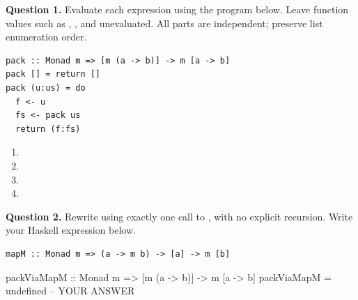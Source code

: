 


\mockrules
\textbf{Question 1.} Evaluate each expression using the program below. Leave
function values such as , , and  unevaluated.
All parts are independent; preserve list enumeration order.
\par\noindent\begin{minipage}{\linewidth}
\begin{lstlisting}
pack :: Monad m => [m (a -> b)] -> m [a -> b]
pack [] = return []
pack (u:us) = do
  f <- u
  fs <- pack us
  return (f:fs)
\end{lstlisting}
\end{minipage}\par
\begin{enumerate}[label=(\alph*)]
\item {}
\answer{[Result.]}
\item {}
\answer{[Result.]}
\item {}
\answer{[Result.]}
\item {}
\end{enumerate}
\textbf{Question 2.} Rewrite  using exactly one call to ,
with no explicit recursion. Write your Haskell expression below.
\par\noindent\begin{minipage}{\linewidth}
\begin{lstlisting}
mapM :: Monad m => (a -> m b) -> [a] -> m [b]
\end{lstlisting}
\end{minipage}\par
\par\noindent\begin{minipage}{\linewidth}
\begin{codeanswer}
packViaMapM :: Monad m => [m (a -> b)] -> m [a -> b]
packViaMapM = undefined  -- YOUR ANSWER
\end{codeanswer}
\end{minipage}\par


